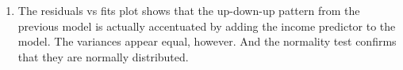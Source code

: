 \documentclass{article}
\providecommand{\tightlist}{%
      \setlength{\itemsep}{0pt}\setlength{\parskip}{0pt}}
\begin{document}
\begin{enumerate}
\def\labelenumi{\alph{enumi})}
\setcounter{enumi}{2}
\tightlist
\item
  The residuals vs fits plot shows that the up-down-up pattern from the
  previous model is actually accentuated by adding the income predictor
  to the model. The variances appear equal, however. And the normality
  test confirms that they are normally distributed.
  
\begin{figure}[!h]
  \begin{floatrow}
  \end{floatrow}
\end{figure}
\end{enumerate}
\end{document}
